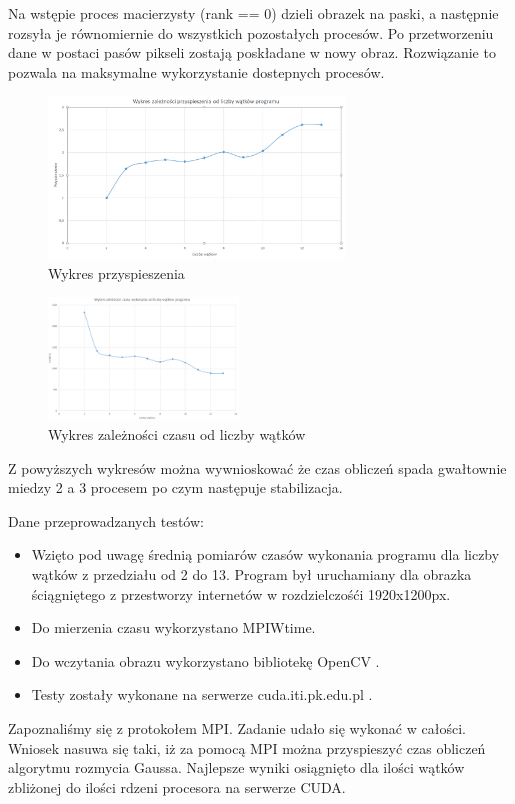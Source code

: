 \documentclass[a4paper,12pt]{article}
\newenvironment{lista}{
\begin{itemize}
  \setlength{\itemsep}{1pt}
  \setlength{\parskip}{0pt}
  \setlength{\parsep}{0pt}
}{\end{itemize}}
\begin{document}
Na wstępie proces macierzysty (rank == 0) dzieli obrazek na paski, a następnie rozsyła je równomiernie do wszystkich pozostałych procesów. Po przetworzeniu dane w postaci pasów pikseli zostają poskładane w nowy obraz. Rozwiązanie to pozwala na maksymalne wykorzystanie dostepnych procesów.

\begin{figure}[!hbp]
	\centering
  \includegraphics[width=0.7\textwidth]{wykres1.png}
  \caption{Wykres przyspieszenia}
\end{figure}


\begin{figure}
  \vspace{-20pt}
  \begin{center}
  \includegraphics[width=0.45\textwidth]{wykres.png}
  \end{center}
  \vspace{-20pt}
  \caption{Wykres zależności czasu od liczby wątków}
  \vspace{-10pt}
\end{figure}

Z powyższych wykresów można wywnioskować że czas obliczeń spada gwałtownie miedzy 2 a 3 procesem po czym następuje stabilizacja.

Dane przeprowadzanych testów:
\begin{lista}
 \item Wzięto pod uwagę średnią pomiarów czasów wykonania programu dla liczby wątków z przedziału od 2 do 13. Program był uruchamiany dla obrazka ściągniętego z przestworzy internetów w rozdzielczośći 1920x1200px.
 \item Do mierzenia czasu wykorzystano MPIWtime.
 \item Do wczytania obrazu wykorzystano bibliotekę OpenCV .
 \item Testy zostały wykonane na serwerze cuda.iti.pk.edu.pl . 
\end{lista}
 
Zapoznaliśmy się z protokołem MPI. Zadanie udało się wykonać w całości. Wniosek nasuwa się taki, iż za pomocą MPI można przyspieszyć czas obliczeń algorytmu rozmycia Gaussa. Najlepsze wyniki osiągnięto dla ilości wątków zbliżonej do ilości rdzeni procesora na serwerze CUDA. 
\end{document}
